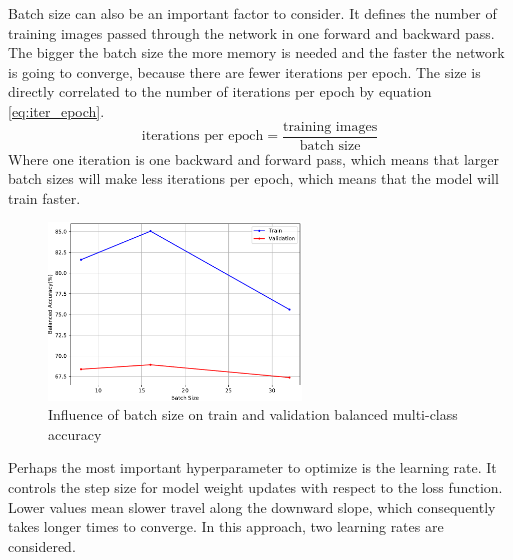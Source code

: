     Batch size can also be an important factor to consider. It defines the number of training images passed through the network in one forward and backward pass. The bigger the batch size the more memory is needed and the faster the network is going to converge, because there are fewer iterations per epoch. The size is directly correlated to the number of iterations per epoch by equation \ref{eq:iter_epoch}.
        \begin{equation}
        \mbox{iterations per epoch}=\frac{\mbox{training images}}{\mbox{batch size}}
        \label{eq:iter_epoch}
        \end{equation}
    Where one iteration is one backward and forward pass, which means that larger batch sizes will make less iterations per epoch, which means that the model will train faster. \par
    \begin{figure}[ht]
        \centering
        \includegraphics[width=0.6\textwidth]{figs/densenet201_batch_comp.pdf}
        \caption{Influence of batch size on train and validation balanced multi-class accuracy}
        \label{fig:batch_comp}
    \end{figure}
    
    Perhaps the most important hyperparameter to optimize is the learning rate. It controls the step size for model weight updates with respect to the loss function. Lower values mean slower travel along the downward slope, which consequently takes longer times to converge. In this approach, two learning rates are considered. \par 
    
